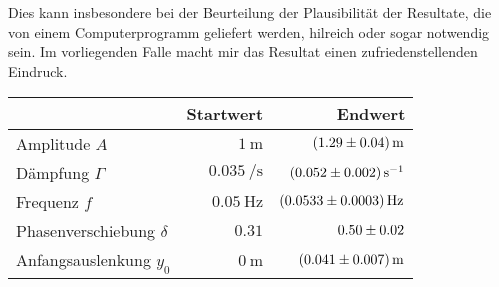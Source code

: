 Dies kann insbesondere bei der  Beurteilung der Plausibilit\"at der Resultate,
die von einem Computerprogramm geliefert werden, hilreich oder sogar notwendig
sein. Im vorliegenden  Falle macht mir das  Resultat einen zufriedenstellenden
Eindruck.

\begin{center}
\begin{tabular}{lrr}
    \toprule
                                & Startwert                  & Endwert \\
    \midrule
    Amplitude $A$               &  $\SI{1}{\meter}$          & $\SI{ 1.29 \pm 0.04}{\meter}$ \\
    D\"ampfung $\Gamma$         &  $\SI{0.035}{\per\second}$ & $\SI{0.052 \pm 0.002}{\per\second}$ \\
    Frequenz $f$                &  $\SI{0.05}{\hertz}$       & $\SI{ 0.0533  \pm 0.0003}{\hertz}$ \\
    Phasenverschiebung $\delta$ &  $0.31$                    & $\num{0.50  \pm 0.02}$ \\
    Anfangsauslenkung $y_0$     &  $\SI{0}{\meter}$          & $\SI{ 0.041 \pm 0.007}{\meter}$ \\
    \bottomrule
\end{tabular}
\end{center}

